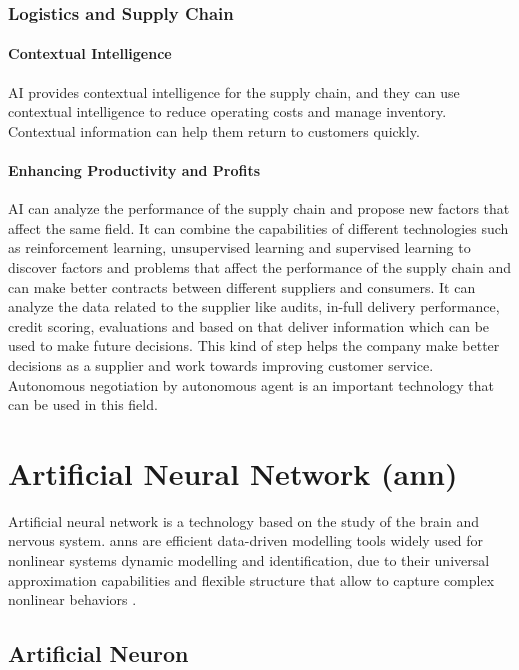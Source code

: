 \subsubsection{Logistics and Supply Chain}
\paragraph{Contextual Intelligence} AI provides contextual intelligence for the supply chain, and they can use contextual intelligence to reduce operating costs and manage inventory. Contextual information can help them return to customers quickly.   
\paragraph{Enhancing Productivity and Profits} AI can analyze the performance of the supply chain and propose new factors that affect the same field. It can combine the capabilities of different technologies such as reinforcement learning, unsupervised learning and supervised learning to discover factors and problems that affect the performance of the supply chain and can make better contracts between different suppliers and consumers\parencite{Pndey2019}. It can analyze the data related to the supplier like audits, in-full delivery performance, credit scoring, evaluations and based on that deliver information which can be used to make future decisions. This kind of step helps the company make better decisions as a supplier and work towards improving customer service. Autonomous negotiation by autonomous agent is an important technology that can be used in this field.

\section{Artificial Neural Network (\gls{ann})}
Artificial neural network is a technology based on the study of the brain and nervous system\parencite{WALCZAK2003631}. \gls{ann}s are efficient data-driven modelling tools widely used for nonlinear systems dynamic modelling and identification, due to their universal approximation capabilities and flexible structure that allow to capture complex nonlinear behaviors \parencite{SHOKRY2018265}. 

\subsection{Artificial Neuron}


